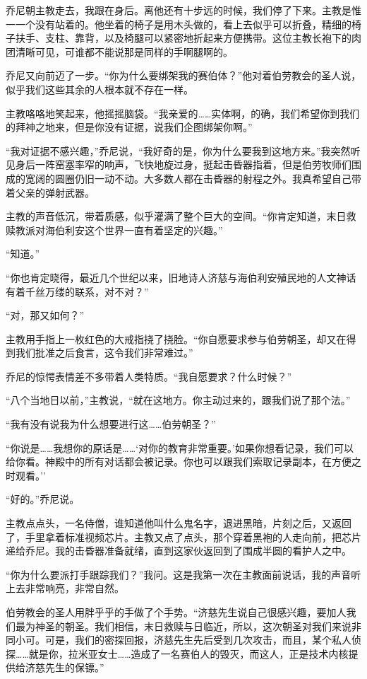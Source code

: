 \documentclass[AutoFakeBold=true]{book}
\begin{document}
乔尼朝主教走去，我跟在身后。离他还有十步远的时候，我们停了下来。主教是惟一一个没有站着的。他坐着的椅子是用木头做的，看上去似乎可以折叠，精细的椅子扶手、支柱、靠背，以及椅腿可以紧密地折起来方便携带。这位主教长袍下的肉团清晰可见，可谁都不能说那是同样的手啊腿啊的。

乔尼又向前迈了一步。``你为什么要绑架我的赛伯体？''他对着伯劳教会的圣人说，似乎我们这些其余的人根本就不存在一样。

主教咯咯地笑起来，他摇摇脑袋。``我亲爱的……实体啊，的确，我们希望你到我们的拜神之地来，但是你没有证据，说我们企图绑架你啊。''

``我对证据不感兴趣，''乔尼说，``我好奇的是，你为什么要我到这地方来。''我突然听见身后一阵窑塞率窄的响声，飞快地旋过身，挺起击昏器指着，但是伯劳牧师们围成的宽阔的圆圈仍旧一动不动。大多数人都在击昏器的射程之外。我真希望自己带着父亲的弹射武器。

主教的声音低沉，带着质感，似乎灌满了整个巨大的空间。``你肯定知道，末日救赎教派对海伯利安这个世界一直有着坚定的兴趣。''

``知道。''

``你也肯定晓得，最近几个世纪以来，旧地诗人济慈与海伯利安殖民地的人文神话有着千丝万缕的联系，对不对？''

``对，那又如何？''

主教用手指上一枚红色的大戒指挠了挠脸。``你自愿要求参与伯劳朝圣，却又在得到我们批准之后食言，这令我们非常难过。''

乔尼的惊愕表情差不多带着人类特质。``我自愿要求？什么时候？''

``八个当地日以前，''主教说，``就在这地方。你主动过来的，跟我们说了那个法。''

``我有没有说我为什么想要进行这……伯劳朝圣？''

``你说是……我想你的原话是……`对你的教育非常重要。'如果你想看记录，我们可以给你看。神殿中的所有对话都会被记录。你也可以跟我们索取记录副本，在方便之时观看。''

``好的。''乔尼说。

主教点点头，一名侍僧，谁知道他叫什么鬼名字，退进黑暗，片刻之后，又返回了，手里拿着标准视频芯片。主教又点了点头，那个穿着黑袍的人走向前，把芯片递给乔尼。我的击昏器准备就绪，直到这家伙返回到了围成半圆的看护人之中。

``你为什么要派打手跟踪我们？''我问。这是我第一次在主教面前说话，我的声音听上去非常响亮，非常自然。

伯劳教会的圣人用胖乎乎的手做了个手势。``济慈先生说自己很感兴趣，要加人我们最为神圣的朝圣。我们相信，末日救赎与日临近，所以，这次朝圣对我们来说非同小可。可是，我们的密探回报，济慈先生先后受到几次攻击，而且，某个私人侦探……就是你，拉米亚女士……造成了一名赛伯人的毁灭，而这人，正是技术内核提供给济慈先生的保镖。''
\end{document}
